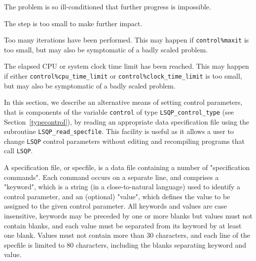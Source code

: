 \documentclass{galahad}
\newcommand{\packagename}{LSQP}
\begin{document}
\begin{description}
 The problem is so ill-conditioned that 
  further progress is impossible.
 
 The step is too small to make further impact.

 Too many iterations have been performed. 
  This may happen if
    {\tt control\%maxit} is too small, but may also be symptomatic of 
    a badly scaled problem.

 The elapsed CPU or system clock time limit has been 
    reached. This may happen if either {\tt control\%cpu\_time\_limit} or
    {\tt control\%clock\_time\_limit} is too small, but may also be symptomatic 
    of a badly scaled problem.

\end{description}


\galfeatures
\noindent In this section, we describe an alternative means of setting 
control parameters, that is components of the variable {\tt control} of type
{\tt \packagename\_control\_type}
(see Section~\ref{typecontrol}), 
by reading an appropriate data specification file using the
subroutine {\tt \packagename\_read\_specfile}. This facility
is useful as it allows a user to change  {\tt \packagename} control parameters 
without editing and recompiling programs that call {\tt \packagename}.

A specification file, or specfile, is a data file containing a number of 
"specification commands". Each command occurs on a separate line, 
and comprises a "keyword", 
which is a string (in a close-to-natural language) used to identify a 
control parameter, and 
an (optional) "value", which defines the value to be assigned to the given
control parameter. All keywords and values are case insensitive, 
keywords may be preceded by one or more blanks but
values must not contain blanks, and
each value must be separated from its keyword by at least one blank.
Values must not contain more than 30 characters, and 
each line of the specfile is limited to 80 characters,
including the blanks separating keyword and value.
\end{document}
